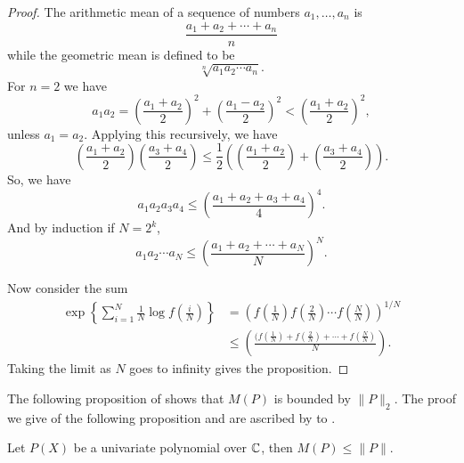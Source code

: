 \begin{proof}
The arithmetic mean of a sequence of numbers $a_1, \ldots, a_n$ is
\[
\frac{a_1 + a_2 + \cdots + a_n}{n}
\]
while the geometric mean is defined to be
\[
\sqrt[n]{a_1 a_2 \cdots a_n}.
\]
For $n = 2$ we have
\[
a_1 a_2 = \left(\frac{a_1 + a_2}{2}\right)^2 
     + \left(\frac{a_1 - a_2}{2}\right)^2
        < \left(\frac{a_1 + a_2}{2}\right)^2,
\]
unless $a_1 = a_2$.  Applying this recursively, we have
\[
\left(\frac{a_1+a_2}{2}\right) \left(\frac{a_3+a_4}{2}\right) \le 
\frac{1}{2} \left(\left(\frac{a_1+a_2}{2}\right)+
\left(\frac{a_3+a_4}{2}\right) \right).
\]
So, we have
\[
a_1 a_2 a_3 a_4 \le \left(\frac{a_1+a_2+a_3+a_4}{4}\right)^4.
\]
And by induction if $N = 2^k$,
\[
a_1 a_2 \cdots a_{N} \le \left(\frac{a_1+a_2+\cdots+a_N}{N}\right)^N.
\]

Now consider the sum
\[
\begin{aligned}
  \exp \left\{\sum_{i=1}^N \frac{1}{N}\log f(\frac{i}{N})\right\}
  &= \left(f(\frac{1}{N}) f(\frac{2}{N}) \cdots
f(\frac{N}{N})\right)^{1/N} \\
& \le \left(\frac{(f(\frac{1}{N}) + f(\frac{2}{N}) + \cdots +
f(\frac{N}{N})}{N}\right).
\end{aligned}
\]
Taking the limit as $N$ goes to infinity gives the proposition.
\end{proof}

The following proposition of {\LandauE} \cite{Landau1905-iv} shows
that $M(P)$ is bounded by $\| P\|_{2}$.  The proof we give of the
following proposition and
 are ascribed by {\Lang}
\cite{Lang1983-zb} to {\Waldschmidt}.

\begin{proposition}[Landau]
\label{Landau:Zeroes:Prop}
Let $P(X)$ be a univariate polynomial over $\mathbb{C}$, then $M(P) \le
\|P\|$.
\end{proposition}

